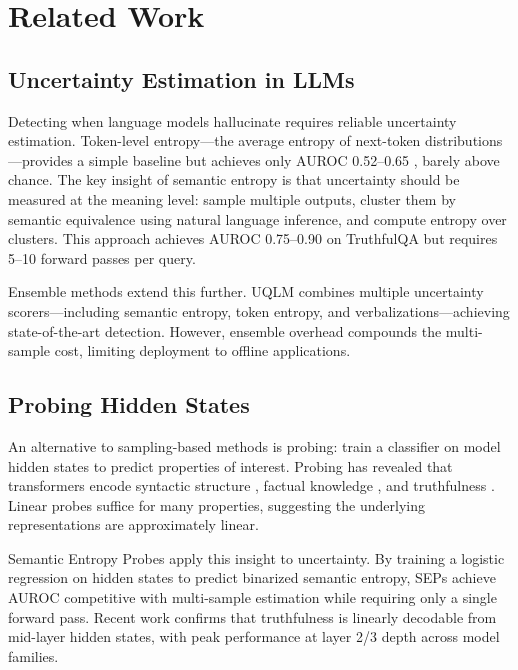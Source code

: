 \section{Related Work}

\subsection{Uncertainty Estimation in LLMs}

Detecting when language models hallucinate requires reliable uncertainty estimation. Token-level entropy---the average entropy of next-token distributions---provides a simple baseline but achieves only AUROC 0.52--0.65 \citep{kadavath2022language}, barely above chance. The key insight of semantic entropy \citep{farquhar2024detecting} is that uncertainty should be measured at the meaning level: sample multiple outputs, cluster them by semantic equivalence using natural language inference, and compute entropy over clusters. This approach achieves AUROC 0.75--0.90 on TruthfulQA but requires 5--10 forward passes per query.

Ensemble methods extend this further. UQLM \citep{vasilev2025uqlm} combines multiple uncertainty scorers---including semantic entropy, token entropy, and verbalizations---achieving state-of-the-art detection. However, ensemble overhead compounds the multi-sample cost, limiting deployment to offline applications.

\subsection{Probing Hidden States}

An alternative to sampling-based methods is probing: train a classifier on model hidden states to predict properties of interest. Probing has revealed that transformers encode syntactic structure \citep{hewitt2019structural}, factual knowledge \citep{petroni2019language}, and truthfulness \citep{azaria2023internal}. Linear probes suffice for many properties, suggesting the underlying representations are approximately linear.

Semantic Entropy Probes \citep{kossen2024semantic} apply this insight to uncertainty. By training a logistic regression on hidden states to predict binarized semantic entropy, SEPs achieve AUROC competitive with multi-sample estimation while requiring only a single forward pass. Recent work confirms that truthfulness is linearly decodable from mid-layer hidden states, with peak performance at layer 2/3 depth across model families.

